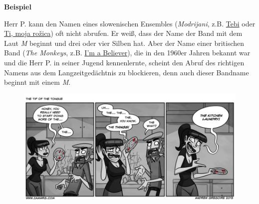 \documentclass[
  letterpaper,
]{scrbook}
\begin{document}
\begin{tcolorbox}[enhanced jigsaw, opacityback=0, colback=white, breakable, toprule=.15mm, rightrule=.15mm, bottomrule=.15mm, colframe=quarto-callout-note-color-frame, arc=.35mm, leftrule=.75mm, left=2mm]
\begin{minipage}[t]{5.5mm}
\textcolor{quarto-callout-note-color}{\faInfo}
\end{minipage}%
\begin{minipage}[t]{\textwidth - 5.5mm}

\textbf{Beispiel}\vspace{2mm}

Herr P. kann den Namen eines slowenischen Ensembles (\emph{Modrijani},
z.B. \href{https://www.youtube.com/watch?v=a7pcqxKHb_E}{Tebi} oder
\href{https://www.youtube.com/watch?v=RuiBoAWfSJE}{Ti, moja rožica}) oft
nicht abrufen. Er weiß, dass der Name der Band mit dem Laut \emph{M}
beginnt und drei oder vier Silben hat. Aber der Name einer britischen
Band (\emph{The Monkeys}, z.B.
\href{https://www.google.com/search?client=firefox-b-d\&q=the+monkeys\#fpstate=ive\&vld=cid:38a2b68e,vid:wB9YIsKIEbA,st:0}{I'm
a Believer}), die in den 1960er Jahren bekannt war und die Herr P. in
seiner Jugend kennenlernte, scheint den Abruf des richtigen Namens aus
dem Langzeitgedächtnis zu blockieren, denn auch dieser Bandname beginnt
mit einem \emph{M}.

\end{minipage}%
\end{tcolorbox}

\begin{figure}

{\centering 

\href{https://www.deviantart.com/iamarg/art/The-Tip-of-the-Tongue-414103082}{\includegraphics[width=1\textwidth,height=\textheight]{./pictures/d6ujnze-d76188d2-5723-46fc-933e-afe0459b1d08.jpg}}

}

\end{figure}
\end{document}
